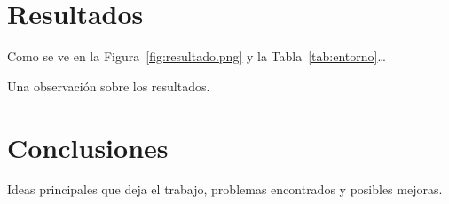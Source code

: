 \documentclass{upo-master}
\begin{document}
\section{Resultados}


Como se ve en la Figura~\ref{fig:resultado.png} y la Tabla~\ref{tab:entorno}\ldots

\begin{nota}
Una observación sobre los resultados.
\end{nota}

\section{Conclusiones}

Ideas principales que deja el trabajo, problemas encontrados y posibles
mejoras.

\declaracionIA

\clearpage
{}
{}


\end{document}
